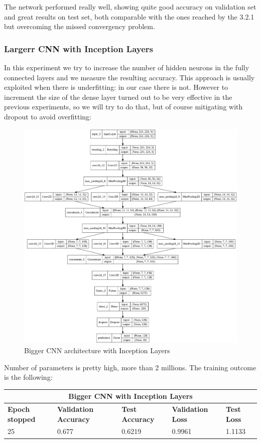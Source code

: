 \medskip

\noindent The network performed really well, showing quite good accuracy on validation set and great results on test set, both comparable with the ones reached by the 3.2.1 but overcoming the missed convergency problem. 


\subsubsection{Largerr CNN with Inception Layers}
In this experiment we try to increase the number of hidden neurons in the fully connected layers and we measure the resulting accuracy. This approach is usually exploited when there is underfitting: in our case there is not. However to increment the size of the dense layer turned out to be very effective in the previous experiments, so we will try to do that, but of course mitigating with dropout to avoid overfitting:

\begin{figure}[H]
	\centering
	\includegraphics[height=0.6\textwidth]{img/scratch/larger_inception_layers.jpg}
	\caption{Bigger CNN architecture with Inception Layers}
	\label{fig: LargerInceptionLayersCNN}
\end{figure}

\noindent Number of parameters is pretty high, more than 2 millions. The training outcome is the following:

\medskip

\begin{tabular}{ |p{2cm}|p{2cm}|p{2cm}|p{2cm}|p{2cm}|  }
\hline
\multicolumn{5}{|c|}{Bigger CNN with Inception Layers} \\
\hline
\textbf{Epoch stopped} & \textbf{Validation Accuracy} & \textbf{Test Accuracy} & \textbf{Validation Loss} & \textbf{Test Loss} \\
\hline
25 & 0.677 & 0.6219 & 0.9961 & 1.1133\\
\hline
\end{tabular}

